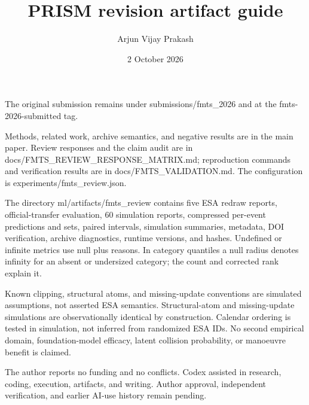 \documentclass{article}
\title{PRISM revision artifact guide}
\author{Arjun Vijay Prakash}
\date{2 October 2026}
\begin{document}
\maketitle
The original submission remains under submissions/fmts\_2026 and at the fmts-2026-submitted tag.

Methods, related work, archive semantics, and negative results are in the main paper. Review responses and the claim audit are in docs/FMTS\_REVIEW\_RESPONSE\_MATRIX.md; reproduction commands and verification results are in docs/FMTS\_VALIDATION.md. The configuration is experiments/fmts\_review.json.

The directory ml/artifacts/fmts\_review contains five ESA redraw reports, official-transfer evaluation, 60 simulation reports, compressed per-event predictions and sets, paired intervals, simulation summaries, metadata, DOI verification, archive diagnostics, runtime versions, and hashes. Undefined or infinite metrics use null plus reasons. In category quantiles a null radius denotes infinity for an absent or undersized category; the count and corrected rank explain it.

Known clipping, structural atoms, and missing-update conventions are simulated assumptions, not asserted ESA semantics. Structural-atom and missing-update simulations are observationally identical by construction. Calendar ordering is tested in simulation, not inferred from randomized ESA IDs. No second empirical domain, foundation-model efficacy, latent collision probability, or manoeuvre benefit is claimed.

The author reports no funding and no conflicts. Codex assisted in research, coding, execution, artifacts, and writing. Author approval, independent verification, and earlier AI-use history remain pending.
\end{document}
